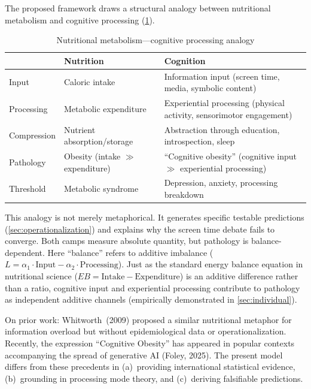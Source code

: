 \documentclass[a4paper,11pt,titlepage]{article}
\newcommand{\balanceL}{L}
\begin{document}
The proposed framework draws a structural analogy between nutritional metabolism and cognitive processing (\cref{tab:analogy}).

\begin{table}[htbp]
\centering
\caption{Nutritional metabolism---cognitive processing analogy}
\label{tab:analogy}
\small
\begin{tabular}{p{2.2cm}p{4.2cm}p{8.2cm}}
\toprule
 & Nutrition & Cognition \\
\midrule
Input & Caloric intake & Information input (screen time, media, symbolic content) \\[3pt]
Processing & Metabolic expenditure & Experiential processing (physical activity, sensorimotor engagement) \\[3pt]
Compression & Nutrient absorption/storage & Abstraction through education, introspection, sleep \\[3pt]
Pathology & Obesity (intake $\gg$ expenditure) & ``Cognitive obesity'' (cognitive input $\gg$ experiential processing) \\[3pt]
Threshold & Metabolic syndrome & Depression, anxiety, processing breakdown \\
\bottomrule
\end{tabular}
\normalsize
\end{table}

This analogy is not merely metaphorical. It generates specific testable predictions (\cref{sec:operationalization}) and explains why the screen time debate fails to converge. Both camps measure absolute quantity, but pathology is balance-dependent. Here ``balance'' refers to additive imbalance ($\balanceL = \alpha_1 \cdot \text{Input} - \alpha_2 \cdot \text{Processing}$). Just as the standard energy balance equation in nutritional science ($EB = \text{Intake} - \text{Expenditure}$) is an additive difference rather than a ratio, cognitive input and experiential processing contribute to pathology as independent additive channels (empirically demonstrated in \cref{sec:individual}).

On prior work: Whitworth~(2009) proposed a similar nutritional metaphor for information overload but without epidemiological data or operationalization. Recently, the expression ``Cognitive Obesity'' has appeared in popular contexts accompanying the spread of generative AI (Foley, 2025). The present model differs from these precedents in (a)~providing international statistical evidence, (b)~grounding in processing mode theory, and (c)~deriving falsifiable predictions.
\end{document}
